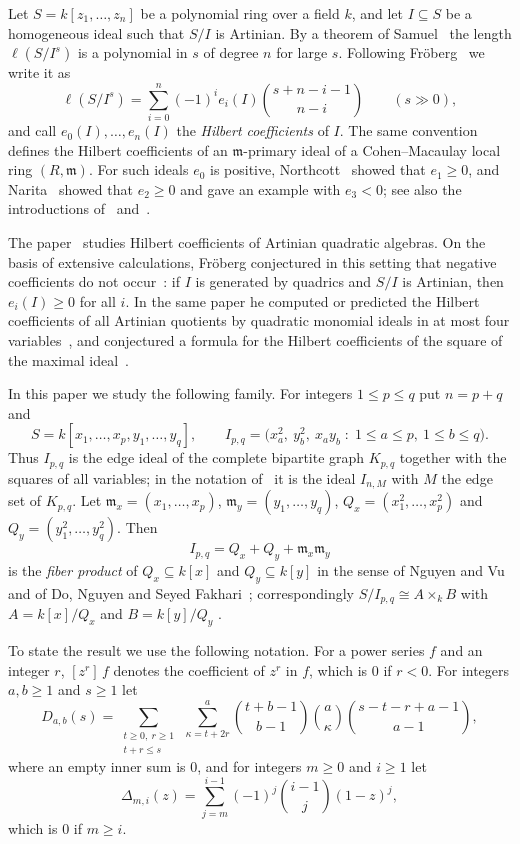 \documentclass{amsart}
\theoremstyle{definition}
\theoremstyle{remark}
\numberwithin{equation}{section}
\newcommand{\mm}{\mathfrak{m}}
\newcommand{\cf}[1]{[#1]\,}
\begin{document}
Let $S=k[z_1,\dots,z_n]$ be a polynomial ring over a field $k$, and let
$I\subseteq S$ be a homogeneous ideal such that $S/I$ is Artinian. By a theorem
of Samuel~\cite{Sam} the length $\ell(S/I^s)$ is a polynomial in $s$ of degree $n$ for
large $s$. Following Fr\"oberg~\cite{Fr} we write it as
\begin{equation}\label{eq:convention}
  \ell(S/I^s)=\sum_{i=0}^{n}(-1)^i e_i(I)\binom{s+n-i-1}{n-i}
  \qquad (s\gg 0),
\end{equation}
and call $e_0(I),\dots,e_n(I)$ the \emph{Hilbert coefficients} of $I$. The
same convention defines the Hilbert coefficients of an $\mm$-primary ideal of
a Cohen--Macaulay local ring $(R,\mm)$. For such ideals $e_0$ is positive,
Northcott~\cite{Nor} showed that $e_1\ge0$, and Narita~\cite{Nar} showed that
$e_2\ge0$ and gave an example with $e_3<0$; see also the introductions
of~\cite{Fr} and~\cite{MN}.

The paper~\cite{Fr} studies Hilbert coefficients of Artinian quadratic
algebras. On the basis of extensive calculations, Fr\"oberg conjectured in
this setting that negative coefficients do not occur~\cite[Conjecture~1.1]{Fr}:
if $I$ is generated by quadrics and $S/I$ is Artinian, then $e_i(I)\ge0$ for
all $i$. In the same paper he computed or predicted the Hilbert coefficients
of all Artinian quotients by quadratic monomial ideals in at most four
variables~\cite[Theorem~3.1, Conjecture~3.2]{Fr}, and conjectured a formula for
the Hilbert coefficients of the square of the maximal
ideal~\cite[Conjecture~3.1]{Fr}.

In this paper we study the following family. For integers $1\le p\le q$ put
$n=p+q$ and
\[
  S=k[x_1,\dots,x_p,y_1,\dots,y_q],\qquad
  I_{p,q}=\bigl(x_a^2,\ y_b^2,\ x_ay_b \;:\; 1\le a\le p,\ 1\le b\le q\bigr).
\]
Thus $I_{p,q}$ is the edge ideal of the complete bipartite graph $K_{p,q}$
together with the squares of all variables; in the notation of~\cite{Fr} it is
the ideal $I_{n,M}$ with $M$ the edge set of $K_{p,q}$. Let
$\mm_x=(x_1,\dots,x_p)$, $\mm_y=(y_1,\dots,y_q)$,
$Q_x=(x_1^2,\dots,x_p^2)$ and $Q_y=(y_1^2,\dots,y_q^2)$. Then
\[
  I_{p,q}=Q_x+Q_y+\mm_x\mm_y
\]
is the \emph{fiber product} of $Q_x\subseteq k[x]$ and $Q_y\subseteq k[y]$ in the
sense of Nguyen and Vu~\cite{NV} and of Do, Nguyen and Seyed
Fakhari~\cite{DNSF}; correspondingly $S/I_{p,q}\cong A\times_k B$ with
$A=k[x]/Q_x$ and $B=k[y]/Q_y$ \cite[Section~1]{DNSF}.

To state the result we use the following notation. For a power series $f$ and
an integer $r$, $\cf{z^r}f$ denotes the coefficient of $z^r$ in $f$, which is
$0$ if $r<0$. For integers $a,b\ge1$ and $s\ge1$ let
\begin{equation}\label{eq:D}
  D_{a,b}(s)=\sum_{\substack{t\ge0,\ r\ge1\\ t+r\le s}}\ \sum_{\kappa=t+2r}^{a}
  \binom{t+b-1}{b-1}\binom{a}{\kappa}\binom{s-t-r+a-1}{a-1},
\end{equation}
where an empty inner sum is $0$, and for integers $m\ge0$ and $i\ge1$ let
\begin{equation}\label{eq:Delta}
  \Delta_{m,i}(z)=\sum_{j=m}^{i-1}(-1)^j\binom{i-1}{j}(1-z)^j,
\end{equation}
which is $0$ if $m\ge i$.
\end{document}

